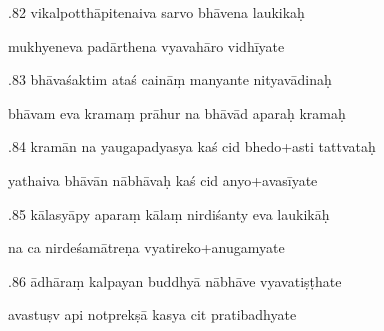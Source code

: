\documentclass[article,12pt,a4paper]{memoir}%
\newcounter{parCount}
\begin{document}
	  
	  \pstart {}.82 vikalpotthāpitenaiva sarvo bhāvena laukikaḥ 
	{}
	\pend%
      

	  
	  \pstart \leavevmode%
	mukhyeneva padārthena vyavahāro vidhīyate 
	{}
	\pend%
      

	  
	  \pstart {}.83 bhāvaśaktim ataś caināṃ manyante nityavādinaḥ 
	{}
	\pend%
      

	  
	  \pstart \leavevmode%
	bhāvam eva kramaṃ prāhur na bhāvād aparaḥ kramaḥ 
	{}
	\pend%
      

	  
	  \pstart {}.84 kramān na yaugapadyasya kaś cid bhedo+asti tattvataḥ 
	{}
	\pend%
      

	  
	  \pstart \leavevmode%
	yathaiva bhāvān nābhāvaḥ kaś cid anyo+avasīyate 
	{}
	\pend%
      

	  
	  \pstart {}.85 kālasyāpy aparaṃ kālaṃ nirdiśanty eva laukikāḥ 
	{}
	\pend%
      

	  
	  \pstart \leavevmode%
	na ca nirdeśamātreṇa vyatireko+anugamyate 
	{}
	\pend%
      

	  
	  \pstart {}.86 ādhāraṃ kalpayan buddhyā nābhāve vyavatiṣṭhate 
	{}
	\pend%
      

	  
	  \pstart \leavevmode%
	avastuṣv api notprekṣā kasya cit pratibadhyate 
	{}
	\pend%
      
\end{document}
